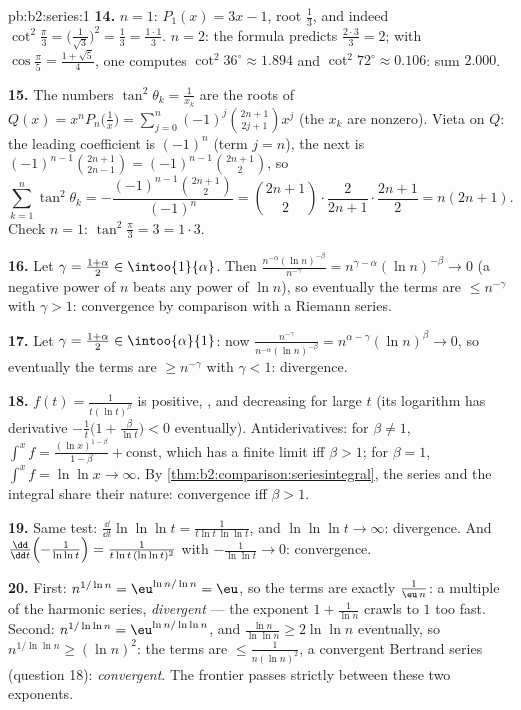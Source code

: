 \begin{solution}{pb:b2:series:1}
\textbf{14.} $n = 1$: $P_1(x) = 3x - 1$, root $\frac13$, and
indeed $\cot^2\frac\pi3 = \bigl(\frac1{\sqrt3}\bigr)^2 =
\frac13 = \frac{1\cdot1}3$. $n = 2$: the formula predicts
$\frac{2\cdot3}3 = 2$; with $\cos\frac\pi5 = \frac{1 +
\sqrt5}{4}$, one computes $\cot^2 36^\circ \approx 1.894$ and
$\cot^2 72^\circ \approx 0.106$: sum $2.000$.

\textbf{15.} The numbers $\tan^2\theta_k = \frac1{x_k}$ are the
roots of $Q(x) = x^nP_n\bigl(\frac1x\bigr) =
\sum_{j=0}^n(-1)^j\binom{2n+1}{2j+1}x^j$ (the $x_k$ are
nonzero). Vieta on $Q$: the leading coefficient is $(-1)^n$
(term $j = n$), the next is $(-1)^{n-1}\binom{2n+1}{2n-1} =
(-1)^{n-1}\binom{2n+1}{2}$, so
\[
\sum_{k=1}^n\tan^2\theta_k =
-\frac{(-1)^{n-1}\binom{2n+1}2}{(-1)^n} = \binom{2n+1}2\cdot
\frac{2}{2n+1}\cdot\frac{2n+1}{2}
= n(2n+1).
\]
Check $n = 1$: $\tan^2\frac\pi3 = 3 = 1\cdot3$.

\textbf{16.} Let $\gamma = \frac{1+\alpha}2 \in
\intoo{1}{\alpha}$. Then $\frac{n^{-\alpha}(\ln
n)^{-\beta}}{n^{-\gamma}} = n^{\gamma - \alpha}(\ln n)^{-\beta}
\to 0$ (a negative power of $n$ beats any power of $\ln n$), so
eventually the terms are $\leq n^{-\gamma}$ with $\gamma > 1$:
convergence by comparison with a Riemann series.

\textbf{17.} Let $\gamma = \frac{1+\alpha}2 \in
\intoo{\alpha}{1}$: now $\frac{n^{-\gamma}}{n^{-\alpha}(\ln
n)^{-\beta}} = n^{\alpha-\gamma}(\ln n)^{\beta} \to 0$, so
eventually the terms are $\geq n^{-\gamma}$ with $\gamma < 1$:
divergence.

\textbf{18.} $f(t) = \frac1{t(\ln t)^\beta}$ is positive,
, and decreasing for large $t$ (its logarithm has
derivative $-\frac1t\bigl(1 + \frac{\beta}{\ln t}\bigr) < 0$
eventually). Antiderivatives: for $\beta \neq 1$,
$\int^x f = \frac{(\ln x)^{1-\beta}}{1-\beta} + \text{const}$,
which has a finite limit iff $\beta > 1$; for $\beta = 1$,
$\int^x f = \ln\ln x \to \infty$. By
\cref{thm:b2:comparison:seriesintegral}, the series and the
integral share their nature: convergence iff $\beta > 1$.

\textbf{19.} Same test: $\frac{\dd}{\dd t}\ln\ln\ln t =
\frac{1}{t\ln t\,\ln\ln t}$, and $\ln\ln\ln t \to \infty$:
divergence. And $\frac{\dd}{\dd t}\Bigl(-\frac1{\ln\ln t}\Bigr)
= \frac{1}{t\ln t\,(\ln\ln t)^2}$ with $-\frac1{\ln\ln t} \to
0$: convergence.

\textbf{20.} First: $n^{1/\ln n} = \eu^{\ln n/\ln n} = \eu$, so
the terms are exactly $\frac{1}{\eu\,n}$: a multiple of the
harmonic series, \emph{divergent} --- the exponent $1 +
\frac1{\ln n}$ crawls to $1$ too fast. Second: $n^{1/\ln\ln n}
= \eu^{\ln n/\ln\ln n}$, and $\frac{\ln n}{\ln\ln n} \geq
2\ln\ln n$ eventually, so $n^{1/\ln\ln n} \geq (\ln n)^2$: the
terms are $\leq \frac1{n(\ln n)^2}$, a convergent Bertrand
series (question 18): \emph{convergent}. The frontier passes
strictly between these two exponents.


\end{solution}

